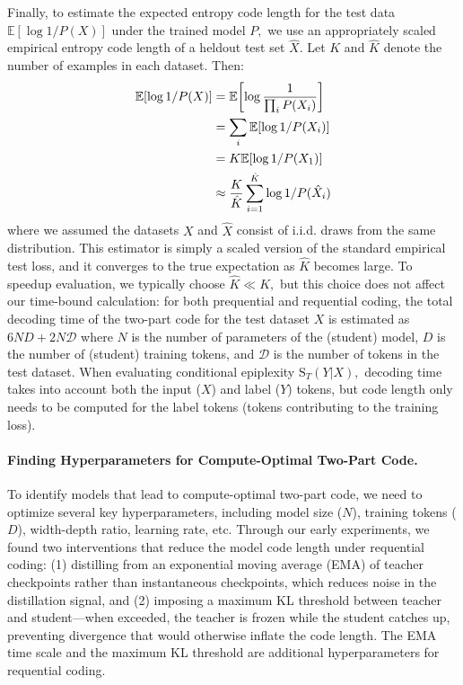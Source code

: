 \documentclass[twoside]{article}
\newcommand{\E}{\mathbb{E}}
\newcommand{\D}{\mathcal{D}}
\newcommand{\rS}{\mathrm{S}}
\begin{document}
Finally, to estimate the expected entropy code length for the test data $\E[\log 1/P(X)]$ under the trained model $P,$ we use an appropriately scaled empirical entropy code length of a heldout test set $\hat{X}.$ Let $K$ and $\hat{K}$ denote the number of examples in each dataset. Then:
\begin{align}
 \E[\log 1/P(X)] &= \E\qty[\log \frac{1}{\prod_i P(X_i)}] \\
 &= \sum_i \E[\log 1/P(X_i)] \\
 &= K \E[\log 1/P(X_1)] \\
&\approx \frac{K}{\hat{K}}\sum_{i=1}^{\hat{K}} \log 1/P(\hat{X}_i)    
\end{align}
where we assumed the datasets $X$ and $\hat{X}$ consist of i.i.d. draws from the same distribution. This estimator is simply a scaled version of the standard empirical test loss, and it converges to the true expectation as $\hat{K}$ becomes large. To speedup evaluation, we typically choose $\hat{K} \ll K,$ but this choice does not affect our time-bound calculation: for both prequential and requential coding, the total decoding time of the two-part code for the test dataset $X$ is estimated as $6ND + 2N\D$ where $N$ is the number of parameters of the (student) model, $D$ is the number of (student) training tokens, and $\D$ is the number of tokens in the test dataset. When evaluating conditional epiplexity $\rS_T(Y|X),$ decoding time takes into account both the input ($X$) and label ($Y$) tokens, but code length only needs to be computed for the label tokens (tokens contributing to the training loss).


\paragraph{Finding Hyperparameters for Compute-Optimal Two-Part Code.}
To identify models that lead to compute-optimal two-part code, we need to optimize several key hyperparameters, including model size ($N$), training tokens ($D$), width-depth ratio, learning rate, etc. Through our early experiments, we found two interventions that reduce the model code length under requential coding: (1) distilling from an exponential moving average (EMA) of teacher checkpoints rather than instantaneous checkpoints, which reduces noise in the distillation signal, and (2) imposing a maximum KL threshold between teacher and student—when exceeded, the teacher is frozen while the student catches up, preventing divergence that would otherwise inflate the code length. The EMA time scale and the maximum KL threshold are additional hyperparameters for requential coding.
\end{document}

